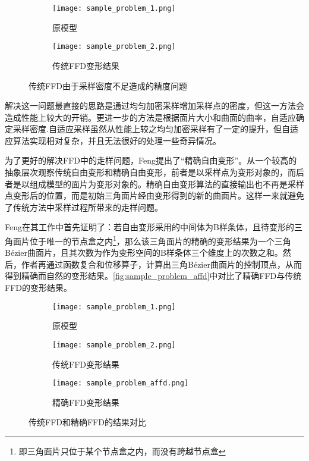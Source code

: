 \begin{figure}[htbp]
	\centering
	\begin{subfigure}[b]{.4\textwidth}
		\centering
		\texttt{[image: sample\_problem\_1.png]}
		\caption{原模型}\label{subfig:sample_problem_0}
	\end{subfigure}
	\quad
	\begin{subfigure}[b]{.4\textwidth}
		\centering
		\texttt{[image: sample\_problem\_2.png]}
		\caption{传统FFD变形结果}\label{subfig:sample_problem_1}
	\end{subfigure}
    \caption{传统FFD由于采样密度不足造成的精度问题}\label{fig:sample_problem}
\end{figure}

    解决这一问题最直接的思路是通过均匀加密采样增加采样点的密度，但这一方法会造成性能上较大的开销。更进一步的方法\cite{parry1986, gain1999}是根据面片大小和曲面的曲率，自适应确定采样密度.自适应采样虽然从性能上较之均匀加密采样有了一定的提升，但自适应算法实现相对复杂，并且无法很好的处理一些奇异情况。

    为了更好的解决FFD中的走样问题，Feng\cite{Feng98}提出了“精确自由变形”。从一个较高的抽象层次观察传统自由变形和精确自由变形，前者是以采样点为变形对象的，而后者是以组成模型的面片为变形对象的。精确自由变形算法的直接输出也不再是采样点变形后的位置，而是初始三角面片经由变形得到的新的曲面片。这样一来就避免了传统方法中采样过程所带来的走样问题。

    Feng在其工作中首先证明了：若自由变形采用的中间体为B样条体，且待变形的三角面片位于唯一的节点盒之内\footnote{即三角面片只位于某个节点盒之内，而没有跨越节点盒}，那么该三角面片的精确的变形结果为一个三角Bézier曲面片，且其次数为作为变形空间的B样条体三个维度上的次数之和。然后，作者再通过函数复合\cite{derose1988, derose1993}和位移算子\cite{chang1984}，计算出三角Bézier曲面片的控制顶点，从而得到精确而自然的变形结果。\autoref{fig:sample_problem_affd}中对比了精确FFD与传统FFD的变形结果。


\begin{figure}[htbp]
	\centering
	\begin{subfigure}[b]{.3\textwidth}
		\centering
		\texttt{[image: sample\_problem\_1.png]}
		\caption{原模型}
	\end{subfigure}
	\quad
	\begin{subfigure}[b]{.3\textwidth}
		\centering
		\texttt{[image: sample\_problem\_2.png]}
		\caption{传统FFD变形结果}
	\end{subfigure}
	\quad
	\begin{subfigure}[b]{.3\textwidth}
		\centering
		\texttt{[image: sample\_problem\_affd.png]}
		\caption{精确FFD变形结果}
	\end{subfigure}
    \caption{传统FFD和精确FFD的结果对比}\label{fig:sample_problem_affd}
\end{figure}

